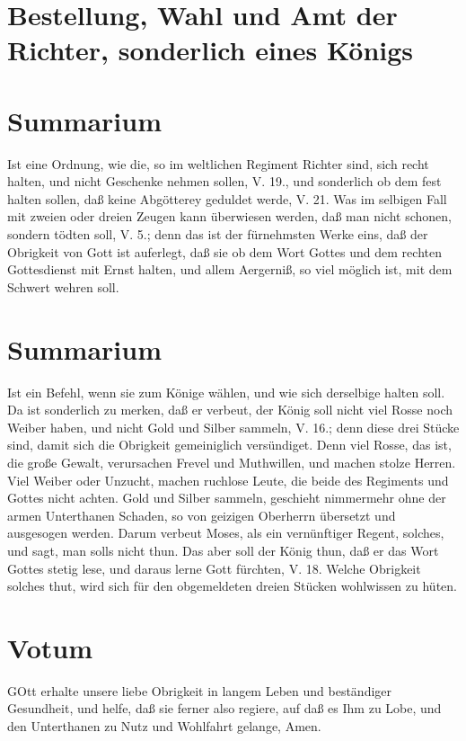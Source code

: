 \section[Bestellung, Wahl und Amt der Richter, sonderlich eines]{Bestellung, Wahl und Amt der Richter, sonderlich eines Königs}

\section{Summarium}

Ist eine Ordnung, wie die, so im weltlichen Regiment Richter sind, sich recht halten, und nicht Geschenke nehmen sollen, V. 19., und sonderlich ob dem fest halten sollen, daß keine Abgötterey geduldet werde, V. 21. Was im selbigen Fall mit zweien oder dreien Zeugen kann überwiesen werden, daß man nicht schonen, sondern tödten soll, V. 5.; denn das ist der fürnehmsten Werke eins, daß der Obrigkeit von Gott ist auferlegt, daß sie ob dem Wort Gottes und dem rechten Gottesdienst mit Ernst halten, und allem Aergerniß, so viel möglich ist, mit dem Schwert wehren soll.

\section{Summarium}

Ist ein Befehl, wenn sie zum Könige wählen, und wie sich derselbige halten soll. Da ist sonderlich zu merken, daß er verbeut, der König soll nicht viel Rosse noch Weiber haben, und nicht Gold und Silber sammeln, V. 16.; denn diese drei Stücke sind, damit sich die Obrigkeit gemeiniglich versündiget. Denn viel Rosse, das ist, die große Gewalt, verursachen Frevel und Muthwillen, und machen stolze Herren. Viel Weiber oder Unzucht, machen ruchlose Leute, die beide des Regiments und Gottes nicht achten. Gold und Silber sammeln, geschieht nimmermehr ohne der armen Unterthanen Schaden, so von geizigen Oberherrn übersetzt und ausgesogen werden. Darum verbeut Moses, als ein vernünftiger Regent, solches, und sagt, man solls nicht thun. Das aber soll der König thun, daß er das Wort Gottes stetig lese, und daraus lerne Gott fürchten, V. 18. Welche Obrigkeit solches thut, wird sich für den obgemeldeten dreien Stücken wohlwissen zu hüten.

\section{Votum}

GOtt erhalte unsere liebe Obrigkeit in langem Leben und beständiger Gesundheit,
und helfe, daß sie ferner also regiere, auf daß es Ihm zu Lobe, und den Unterthanen zu Nutz und Wohlfahrt gelange, Amen.

